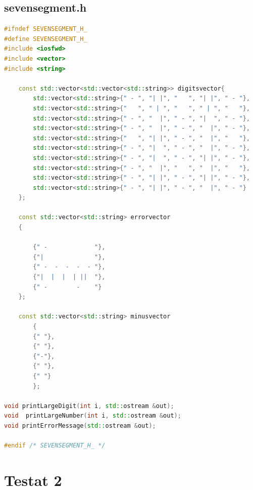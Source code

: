 \subsection{sevensegment.h}
\begin{lstlisting}[language=C++]
#ifndef SEVENSEGMENT_H_
#define SEVENSEGMENT_H_
#include <iosfwd>
#include <vector>
#include <string>

	const std::vector<std::vector<std::string>> digitsvector{
		std::vector<std::string>{" - ", "| |", "   ", "| |", " - "},
		std::vector<std::string>{"   ", " | ", "   ", " | ", "   "},
		std::vector<std::string>{" - ", "  |", " - ", "|  ", " - "},
		std::vector<std::string>{" - ", "  |", " - ", "  |", " - "},
		std::vector<std::string>{"   ", "| |", " - ", "  |", "   "},
		std::vector<std::string>{" - ", "|  ", " - ", "  |", " - "},
		std::vector<std::string>{" - ", "|  ", " - ", "| |", " - "},
		std::vector<std::string>{" - ", "  |", "   ", "  |", "   "},
		std::vector<std::string>{" - ", "| |", " - ", "| |", " - "},
		std::vector<std::string>{" - ", "| |", " - ", "  |", " - "}
	};

	const std::vector<std::string> errorvector
	{

		{" -             "},
		{"|              "},
		{" -  -  -  -  - "},
		{"|  |  |  | ||  "},
		{" -        -    "}
	};

	const std::vector<std::string> minusvector
		{
		{" "},
		{" "},
		{"-"},
		{" "},
		{" "}
		};

void printLargeDigit(int i, std::ostream &out);
void  printLargeNumber(int i, std::ostream &out);
void printErrorMessage(std::ostream &out);

#endif /* SEVENSEGMENT_H_ */
\end{lstlisting}
\section{Testat 2}
